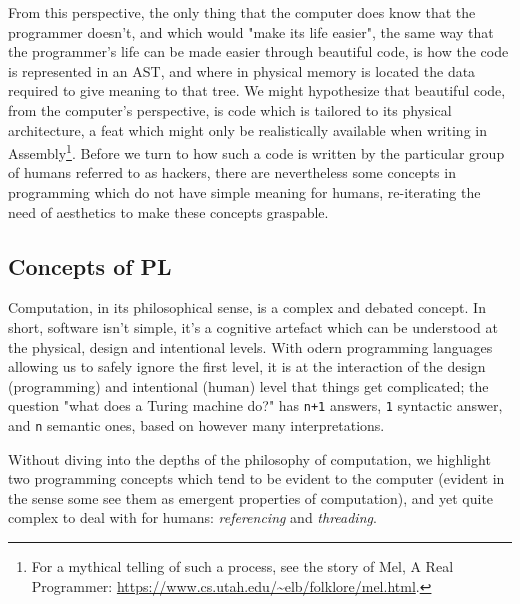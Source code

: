 \documentclass{article}
\begin{document}
From this perspective, the only thing that the computer does know that the programmer doesn't, and which would "make its life easier", the same way that the programmer's life can be made easier through beautiful code, is how the code is represented in an AST, and where in physical memory is located the data required to give meaning to that tree\cite{stansifer_study_1994}. We might hypothesize that beautiful code, from the computer's perspective, is code which is tailored to its physical architecture, a feat which might only be realistically available when writing in Assembly\footnote{For a mythical telling of such a process, see the story of Mel, A Real Programmer: \url{https://www.cs.utah.edu/~elb/folklore/mel.html}.}. Before we turn to how such a code is written by the particular group of humans referred to as hackers, there are nevertheless some concepts in programming which do not have simple meaning for humans, re-iterating the need of aesthetics to make these concepts graspable.

\subsection{Concepts of PL}

Computation, in its philosophical sense, is a complex and debated concept\cite{rapaport_philosophy_2005,smith_origin_1998}. In short, software isn't simple, it's a cognitive artefact which can be understood at the physical, design and intentional levels\cite{moor_three_1978}. With odern programming languages allowing us to safely ignore the first level, it is at the interaction of the design (programming) and intentional (human) level that things get complicated; the question "what does a Turing machine do?" has \lstinline{n+1} answers, \lstinline{1} syntactic answer, and \lstinline{n} semantic ones, based on however many interpretations.

Without diving into the depths of the philosophy of computation, we highlight two programming concepts which tend to be evident to the computer (evident in the sense some see them as emergent properties of computation), and yet quite complex to deal with for humans: \emph{referencing} and \emph{threading}.
\end{document}
